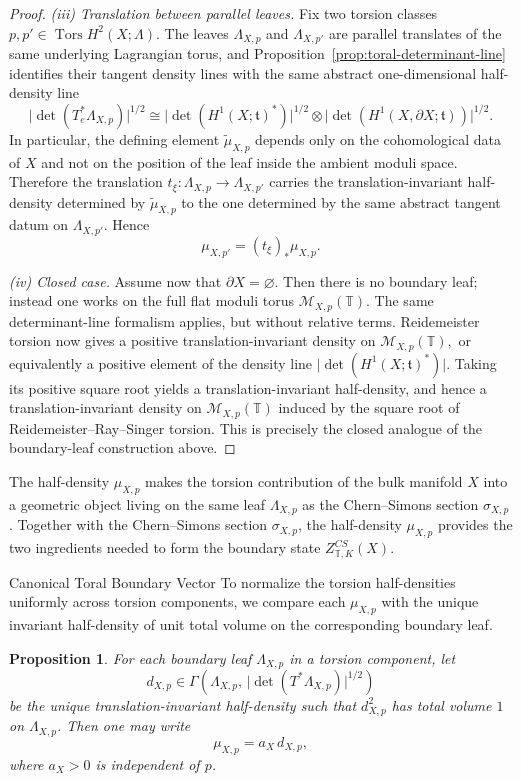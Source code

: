 \documentclass[12pt]{amsart}
\makeatletter
\renewcommand\subsection{\@startsection{subsection}{2}%
  \z@{.5\linespacing\@plus.7\linespacing}{-.5em}%
  {\normalfont\bfseries}}
\numberwithin{equation}{section}
\newtheorem{prop}[theorem]{Proposition}
\makeatother
\begin{document}
\begin{proof}
\smallskip
\noindent
\emph{(iii) Translation between parallel leaves.}
Fix two torsion classes $p,p'\in \operatorname{Tors}H^2(X;\Lambda)$. The leaves $\Lambda_{X,p}$ and
$\Lambda_{X,p'}$ are parallel translates of the same underlying Lagrangian torus, and
Proposition~\ref{prop:toral-determinant-line} identifies their tangent density lines with the same abstract
one-dimensional half-density line
\[
\bigl|\det(T_e^*\Lambda_{X,p})\bigr|^{1/2}
\cong
\bigl|\det(H^1(X;\mathfrak t)^*)\bigr|^{1/2}
\otimes
\bigl|\det(H^1(X,\partial X;\mathfrak t))\bigr|^{1/2}.
\]
In particular, the defining element $\widetilde{\mu}_{X,p}$ depends only on the cohomological data of
$X$ and not on the position of the leaf inside the ambient moduli space. Therefore the translation
$t_\xi\colon \Lambda_{X,p}\to \Lambda_{X,p'}$ carries the translation-invariant half-density determined by
$\widetilde{\mu}_{X,p}$ to the one determined by the same abstract tangent datum on $\Lambda_{X,p'}$.
Hence
\[
\mu_{X,p'}=(t_\xi)_*\mu_{X,p}.
\]

\smallskip
\noindent
\emph{(iv) Closed case.}
Assume now that $\partial X=\varnothing$. Then there is no boundary leaf; instead one works on the full
flat moduli torus $\mathcal M_{X,p}(\mathbb T).$ The same determinant-line formalism applies, but without relative terms. Reidemeister torsion now gives a
positive translation-invariant density on $\mathcal M_{X,p}(\mathbb T),$ or equivalently a positive element of the density line $\bigl|\det(H^1(X;\mathfrak t)^*)\bigr|.$
Taking its positive square root yields a translation-invariant half-density, and hence a translation-invariant
density on $\mathcal M_{X,p}(\mathbb T)$ induced by the square root of
Reidemeister\/--Ray\/--Singer torsion. This is precisely the closed analogue of the boundary-leaf
construction above.
\end{proof}


The half-density \(\mu_{X,p}\) makes the torsion contribution of the bulk manifold \(X\) into a geometric object living on the same leaf \(\Lambda_{X,p}\) as the Chern--Simons section \(\sigma_{X,p}\). Together with the Chern--Simons section \(\sigma_{X,p}\), the half-density \(\mu_{X,p}\) provides the two ingredients needed to form the boundary state \(Z^{CS}_{\mathbb T,K}(X)\).


\subsection{Canonical Toral Boundary Vector}
To normalize the torsion half-densities uniformly across torsion components, we compare each $\mu_{X,p}$
with the unique invariant half-density of unit total volume on the corresponding boundary leaf.
\begin{prop}
\label{prop:normalized-invariant-half-density}
For each boundary leaf $\Lambda_{X,p}$ in a torsion component, let
\[
d_{X,p}\in \Gamma\!\left(
\Lambda_{X,p},\,
\bigl|\det(T^*\Lambda_{X,p})\bigr|^{1/2}
\right)
\]
be the unique translation-invariant half-density such that $d_{X,p}^2$ has total volume $1$ on
$\Lambda_{X,p}$. Then one may write
\[
\mu_{X,p}=a_X\,d_{X,p},
\]
where $a_X>0$ is independent of $p$.
\end{prop}
\end{document}
